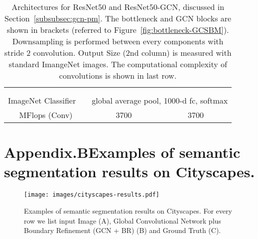 \documentclass[10pt,twocolumn,letterpaper]{article}
\begin{document}
\begin{table*}[h]
\begin{center}
\begin{tabular}{|c|c|c|c|}
            & & \multicolumn{1}{c|}{} & \multicolumn{1}{c|}{}\\
            & & \multicolumn{1}{c|}{} & \multicolumn{1}{c|}{}\\
            \hline
            ImageNet Classifier & &  \multicolumn{2}{c|}{global average pool, 1000-d fc, softmax} \\
            \hline
            \multicolumn{2}{|c|}{MFlops (Conv)} & 3700 & 3700 \\
            \hline
         \end{tabular}
      \end{center}
      \caption{Architectures for ResNet50 and ResNet50-GCN, discussed in Section~\ref{subsubsec:gcn-pm}. The bottleneck and GCN blocks are shown in brackets (referred to Figure~\ref{fig:bottleneck-GCSBM}). Downsampling is performed between every components with stride 2 convolution. Output Size (2nd column) is measured with standard ImangeNet  images. The computational complexity of convolutions is shown in last row. }
      \label{table:two-network-details}
   \end{table*}
\clearpage
   \section*{\centering Appendix.B\quad Examples of semantic segmentation results on Cityscapes.}
   \begin{figure*}[htbp]
      \begin{center}
         \texttt{[image: images/cityscapes-results.pdf]}
      \end{center}
      \caption{Examples of semantic segmentation results on Cityscapes. For every row we list input Image (A), Global Convolutional Network plus Boundary Refinement (GCN + BR) (B) and Ground Truth (C). }
      \label{fig:cityscapes-results}
   \end{figure*}
\end{document}
